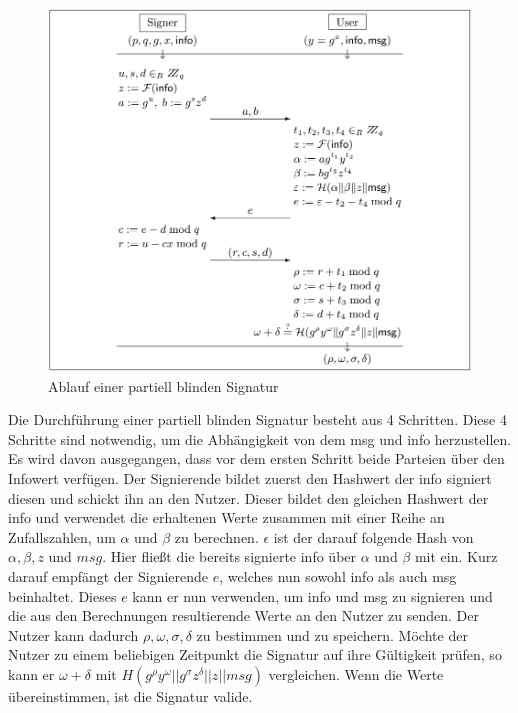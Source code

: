 \documentclass[11pt,a4paper]{scrreprt}
\begin{document}
\begin{figure}[H]
    \label{fig:partBlindSig}
    \centering
    \includegraphics*[width=1\textwidth]{partBlindSig.png}
    \caption{Ablauf einer partiell blinden Signatur \cite{abe2000provably}}
\end{figure}

Die Durchführung einer partiell blinden Signatur besteht aus 4 Schritten. Diese 4 Schritte sind notwendig, um die Abhängigkeit von dem msg und info herzustellen. Es wird davon ausgegangen, dass vor dem ersten Schritt beide Parteien über den Infowert verfügen. Der Signierende bildet zuerst den Hashwert der info signiert diesen und schickt ihn an den Nutzer. Dieser bildet den gleichen Hashwert der info und verwendet die erhaltenen Werte zusammen mit einer Reihe an Zufallszahlen, um $\alpha$ und $\beta$ zu berechnen. $\epsilon$ ist der darauf folgende Hash von $\alpha,\beta,z$ und $msg$. Hier fließt die bereits signierte info über $\alpha$ und $\beta$ mit ein. Kurz darauf empfängt der Signierende $e$, welches nun sowohl info als auch msg beinhaltet. Dieses $e$ kann er nun verwenden, um info und msg zu signieren und die aus den Berechnungen resultierende Werte an den Nutzer zu senden. Der Nutzer kann dadurch $\rho,\omega,\sigma ,\delta$ zu bestimmen und zu speichern. Möchte der Nutzer zu einem beliebigen Zeitpunkt die Signatur auf ihre Gültigkeit prüfen, so kann er $\omega + \delta$ mit  $H (g^\rho y^\omega || g^\sigma z^\delta || z || msg)$ vergleichen. Wenn die Werte übereinstimmen, ist die Signatur valide.
\end{document}
